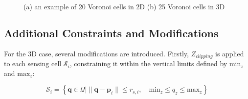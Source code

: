         \begin{figure}[H]
            \centering
            \caption{
                (a) an example of 20 Voronoi cells in 2D \cite{Voronoi2d} (b) 25 Voronoi cells in 3D \cite{Voronoi3d}
            }
            \label{fig:voronoi_diagrams}
        \end{figure}
    
    \subsection{Additional Constraints and Modifications}
        For the 3D case, several modifications are introduced.  
        Firstly, $Z_{clipping}$ is applied to each sensing cell $\mathcal{S}_i$, constraining it within the vertical limits defined by $\text{min}_z$ and $\text{max}_z$:

        \begin{equation}
            \mathcal{S}_i = \left\{\mathbf{q} \in \mathcal{Q} \mid \|\mathbf{q} - \mathbf{p}_i\| \leq r_{s,i}, \quad \text{min}_z \leq q_z \leq \text{max}_z \right\}
        \end{equation}

